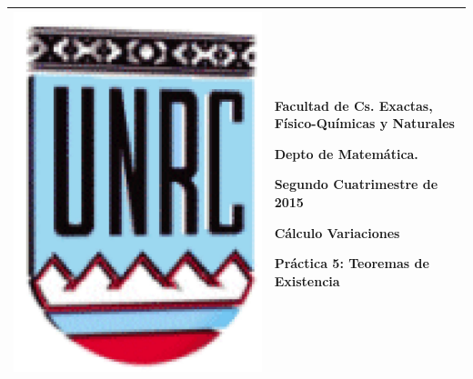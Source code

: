 \documentclass{article}
\begin{document}
\setlength{\unitlength}{1cm}
%
\setlength{\extrarowheight}{5mm}
%

\setlength{\extrarowheight}{-5mm}
\noindent\begin{tabular}{m{} m{}}\hline\hline
\medskip

\includegraphics[scale=0.3]{imagenes/unrc.jpg} &
\begin{bfseries}  \begin{scshape}
Facultad de Cs. Exactas, Físico-Químicas y Naturales\par
        Depto de Matem\'atica.\par
        Segundo Cuatrimestre de 2015\par
        Cálculo Variaciones \par

        Práctica 5: Teoremas de Existencia
				\end{scshape}
\end{bfseries}
\\
\hline\hline
\end{tabular}
\renewcommand{\theenumi}{\alph{enumi}}
\end{document}
